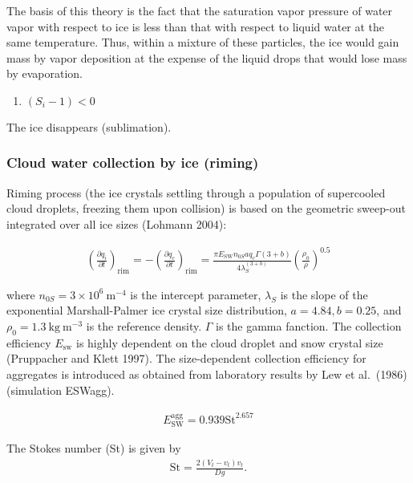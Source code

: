 The basis of this theory is the fact that the saturation vapor pressure
of water vapor with respect to ice is less than that with respect to
liquid water at the same temperature. Thus, within a mixture of these
particles, the ice would gain mass by vapor deposition at the expense of
the liquid drops that would lose mass by evaporation.

\begin{enumerate}
\def\labelenumi{\arabic{enumi}.}
\tightlist
\item
  \((S_i - 1)<0\)
\end{enumerate}

The ice disappears (sublimation).

\hypertarget{cloud-water-collection-by-ice-riming}{%
\subsubsection{Cloud water collection by ice
(riming)}\label{cloud-water-collection-by-ice-riming}}

Riming process (the ice crystals settling through a population of
supercooled cloud droplets, freezing them upon collision) is based on
the geometric sweep-out integrated over all ice sizes (Lohmann 2004):

\begin{eqnarray}
\left(\frac{\partial q_i}{\partial t}\right)_{\text {rim}}
=-\left(\frac{\partial q_c}{\partial t}\right)_{\text {rim}}
=\frac{\pi E_{\mathrm{SW}} n_{0S} a q_{c} \Gamma(3+b)}{4 \lambda_{S}^{(3+b)}}\left(\frac{\rho_{0}}{\rho}\right)^{0.5}
\end{eqnarray}

where \(n_{0 S}=3 \times 10^{6} \mathrm{~m}^{-4}\) is the intercept
parameter, \(\lambda_{S}\) is the slope of the exponential
Marshall-Palmer ice crystal size distribution, \(a=4.84, b=0.25\), and
\(\rho_{0}=1.3 \mathrm{~kg} \mathrm{~m}^{-3}\) is the reference density.
\(\Gamma\) is the gamma fanction. The collection efficiency
\(E_{\mathrm{sw}}\) is highly dependent on the cloud droplet and snow
crystal size (Pruppacher and Klett 1997). The size-dependent collection
efficiency for aggregates is introduced as obtained from laboratory
results by Lew et al.~(1986) (simulation ESWagg).

\begin{eqnarray}
E_{\mathrm{SW}}^{\mathrm{agg}}=0.939 \mathrm{St}^{2.657}
\end{eqnarray}

The Stokes number (St) is given by \begin{eqnarray}
\mathrm{St}=\frac{2\left(V_{t}-{v}_{t}\right) {v}_{t}}{D g}.
\end{eqnarray}

